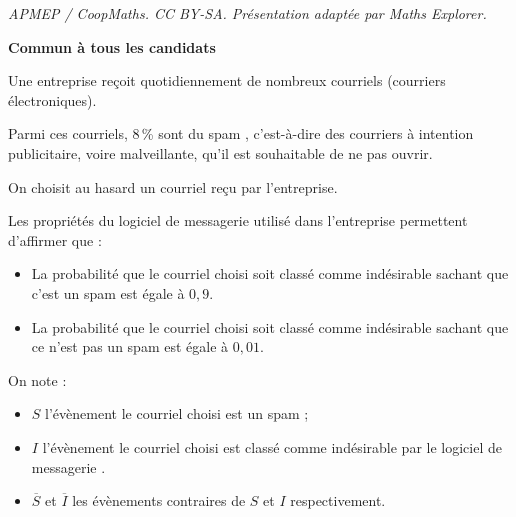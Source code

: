 \documentclass[10pt]{article}
\begin{document}
\noindent\textit{APMEP / CoopMaths. CC BY-SA. Présentation adaptée par Maths Explorer.}\par\medskip
\textbf{Commun à tous les candidats}

\medskip

Une entreprise reçoit quotidiennement de nombreux courriels (courriers électroniques).

Parmi ces courriels, 8\,\% sont du \og spam \fg, c'est-à-dire des courriers à intention publicitaire, voire malveillante, qu'il est souhaitable de ne pas ouvrir.

On choisit au hasard un courriel reçu par l'entreprise.

Les propriétés du logiciel de messagerie utilisé dans l'entreprise permettent d'affirmer que :

\setlength\parindent{1cm}
\begin{itemize}
\item[$\bullet~~$]La probabilité que le courriel choisi soit classé comme \og indésirable\fg{} sachant que c'est un spam est égale à $0,9$.
\item[$\bullet~~$]La probabilité que le courriel choisi soit classé comme \og indésirable\fg{} sachant que ce n'est pas un spam est égale à $0,01$.
\end{itemize}
\setlength\parindent{0cm}

On note :

\setlength\parindent{1cm}
\begin{itemize}
\item[$\bullet~~$]$S$ l'évènement \og le courriel choisi est un spam \fg ;
\item[$\bullet~~$]$I$ l'évènement \og le courriel choisi est classé comme indésirable par le logiciel de messagerie \fg.
\item[$\bullet~~$]$\overline{S}$ et $\overline{I}$ les évènements contraires de $S$ et $I$ respectivement.
\end{itemize}
\setlength\parindent{0cm}

\medskip
\end{document}
